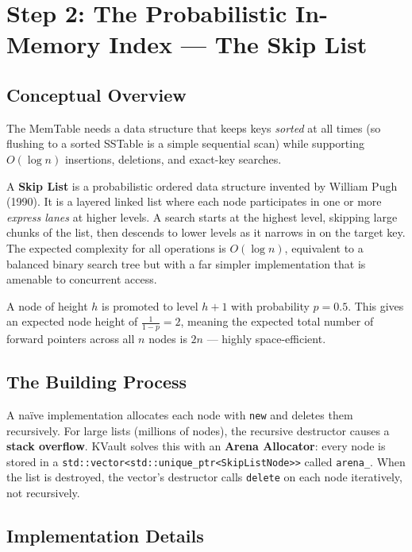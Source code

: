 \documentclass[11pt,a4paper]{article}
\begin{document}
\section{Step 2: The Probabilistic In-Memory Index --- The Skip List}
\label{sec:skiplist}

\subsection{Conceptual Overview}

The MemTable needs a data structure that keeps keys \emph{sorted} at all times
(so flushing to a sorted SSTable is a simple sequential scan) while supporting
$O(\log n)$ insertions, deletions, and exact-key searches.

A \textbf{Skip List} is a probabilistic ordered data structure invented by
William Pugh (1990). It is a layered linked list where each node participates
in one or more \emph{express lanes} at higher levels. A search starts at the
highest level, skipping large chunks of the list, then descends to lower levels
as it narrows in on the target key. The expected complexity for all operations
is $O(\log n)$, equivalent to a balanced binary search tree but with a far
simpler implementation that is amenable to concurrent access.

A node of height $h$ is promoted to level $h+1$ with probability $p = 0.5$.
This gives an expected node height of $\frac{1}{1-p} = 2$, meaning the
expected total number of forward pointers across all $n$ nodes is $2n$ ---
highly space-efficient.

\subsection{The Building Process}

A na\"ive implementation allocates each node with \texttt{new} and deletes
them recursively. For large lists (millions of nodes), the recursive
destructor causes a \textbf{stack overflow}. KVault solves this with an
\textbf{Arena Allocator}: every node is stored in a
\texttt{std::vector<std::unique\_ptr<SkipListNode>>} called \texttt{arena\_}.
When the list is destroyed, the vector's destructor calls \texttt{delete} on
each node iteratively, not recursively.

\subsection{Implementation Details}
\end{document}
